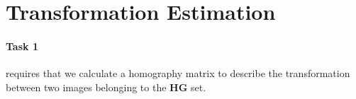 \section{Transformation Estimation}

\paragraph{Task 1} requires that we calculate a homography matrix to describe the transformation between two images belonging to the \textbf{HG} set. 